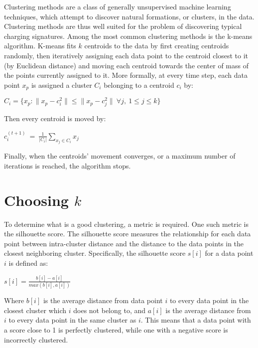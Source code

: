 \documentclass[12pt, american]{report}
\begin{document}
Clustering methods are a class of generally unsupervised machine learning techniques, which attempt to discover natural formations, or clusters, in the data. Clustering methods are thus well suited for the problem of discovering typical charging signatures. 
Among the most common clustering methods is the k-means algorithm. K-means fits $k$ centroids to the data by first creating centroids randomly, then iteratively assigning each data point to the centroid closest to it (by Euclidean distance) and moving each centroid towards the center of mass of the points currently assigned to it. More formally, at every time step, each data point $x_p$ is assigned a cluster $C_i$ belonging to a centroid $c_i$ by:

\begin{center}
\label{eq:k-means_1}
$
C_i = \{ x_p: \| x_p - c_i^2\| \leq \| x_p - c_j^2\| \ \forall j,\ 1\leq j\leq k\}
$
\end{center}

\noindent Then every centroid is moved by:
\begin{center}
\label{eq:k-means_2}
$c_i^{(t+1)}\ =\ \frac{1}{\left|C_i\right|}\sum_{x_j\in C_i} x_j$
\end{center}

\noindent Finally, when the centroids’ movement converges, or a maximum number of iterations is reached, the algorithm stops. 

\section{Choosing $k$}

To determine what is a good clustering, a metric is required. One such metric is the silhouette score. The silhouette score measures the relationship for each data point between intra-cluster distance and the distance to the data points in the closest neighboring cluster. Specifically, the silhouette score $s\left[i\right]$ for a data point $i$ is defined as:
\begin{center}
$ s\left[i\right]=\frac{b\left[i\right]-a\left[i\right]}{max\left(b\left[i\right],a\left[i\right]\right)} $
\end{center}
Where $b\left[i\right]$ is the average distance from data point $i$ to every data point in the closest cluster which $i$ does not belong to, and $a\left[i\right]$ is the average distance from $i$ to every data point in the same cluster as $i$. This means that a data point with a score close to 1 is perfectly clustered, while one with a negative score is incorrectly clustered.
\end{document}
